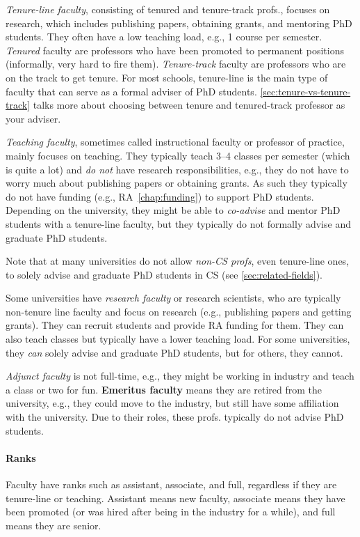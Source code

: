 \documentclass[oneside,11pt,dvipsnames]{book}
\begin{document}
\emph{Tenure-line faculty}, consisting of tenured and tenure-track profs., focuses on research, which includes publishing papers, obtaining grants, and mentoring PhD students.  They often have a low teaching load, e.g., 1 course per semester. \emph{Tenured} faculty are professors who have been promoted to permanent positions (informally, very hard to fire them).  \emph{Tenure-track} faculty are professors who are on the track to get tenure.  For most schools, tenure-line is the main type of faculty that can serve as a formal adviser of PhD students. \autoref{sec:tenure-vs-tenure-track} talks more about choosing between tenure and tenured-track professor as your adviser.

\emph{Teaching faculty}, sometimes called instructional faculty or professor of practice, mainly focuses on teaching. They typically teach 3--4 classes per semester (which is quite a lot) and \emph{do not} have research responsibilities, e.g., they do not have to worry much about publishing papers or obtaining grants. As such they typically do not have funding (e.g., RA~\autoref{chap:funding}) to support PhD students.
Depending on the university, they might be able to \emph{co-advise} and mentor PhD students with a tenure-line faculty, but they typically do not formally advise and graduate PhD students.

Note that at many universities do not allow \emph{non-CS profs}, even tenure-line ones, to solely advise and graduate PhD students in CS (see \autoref{sec:related-fields}). 

Some universities have \emph{research faculty} or research scientists, who are typically non-tenure line faculty and focus on research (e.g., publishing papers and getting grants). 
They can recruit students and provide RA funding for them. 
They can also teach classes but typically have a lower teaching load.
For some universities, they \emph{can} solely advise and graduate PhD students, but for others, they cannot. 

\emph{Adjunct faculty} is not full-time, e.g., they might be working in industry and teach a class or two for fun. \textbf{Emeritus faculty} means they are retired from the university, e.g., they could move to the industry, but still have some affiliation with the university.   Due to their roles, these profs. typically do not advise PhD students.


\paragraph{Ranks} Faculty have ranks such as assistant, associate, and full, regardless if they are tenure-line or teaching.  Assistant means new faculty, associate means they have been promoted (or was hired after being in the industry for a while), and full means they are senior. 
\end{document}
